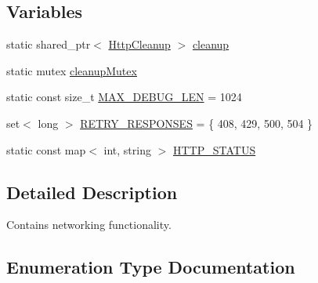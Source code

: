 \subsection*{Variables}
\begin{DoxyCompactItemize}
\item 
static shared\+\_\+ptr$<$ \hyperlink{classdg_1_1deepcore_1_1network_1_1_http_cleanup}{Http\+Cleanup} $>$ \hyperlink{namespacedg_1_1deepcore_1_1network_aa6af71198ea26578d79a088d54bf3fd4}{cleanup}
\item 
static mutex \hyperlink{namespacedg_1_1deepcore_1_1network_a37e8315e615e6bb14b06c76f5eff5963}{cleanup\+Mutex}
\item 
static const size\+\_\+t \hyperlink{namespacedg_1_1deepcore_1_1network_aab421b85c3d0dc5fecb970e3790f9e0b}{M\+A\+X\+\_\+\+D\+E\+B\+U\+G\+\_\+\+L\+EN} = 1024
\item 
set$<$ long $>$ \hyperlink{namespacedg_1_1deepcore_1_1network_aac2ec119bfabeb0695c296eeffaac58c}{R\+E\+T\+R\+Y\+\_\+\+R\+E\+S\+P\+O\+N\+S\+ES} = \{ 408, 429, 500, 504 \}
\item 
static const map$<$ int, string $>$ \hyperlink{namespacedg_1_1deepcore_1_1network_a3c20dd1e9f91ecf06c6776207829cc5e}{H\+T\+T\+P\+\_\+\+S\+T\+A\+T\+US}
\end{DoxyCompactItemize}


\subsection{Detailed Description}
Contains networking functionality. 

\subsection{Enumeration Type Documentation}
